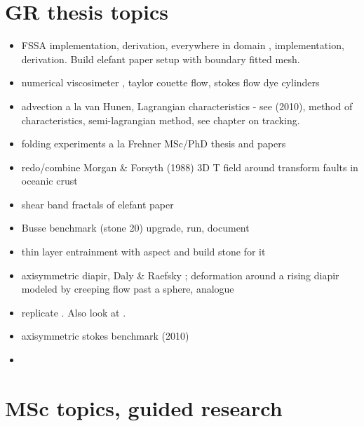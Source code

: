 \documentclass[a4paper]{article}
\begin{document}
\section{GR thesis topics}
\begin{itemize} 
\item FSSA implementation, derivation, everywhere in domain \cite{sctc20}, implementation, derivation. Build elefant paper
      setup with boundary fitted mesh.
\item numerical viscosimeter \cite{batt84}, taylor couette flow, stokes flow dye cylinders
\item advection a la van Hunen, Lagrangian characteristics - see \textcite{bepo10} (2010), method 
      of characteristics, semi-lagrangian method, see chapter on tracking.
\item folding experiments a la Frehner MSc/PhD thesis and papers 
\item redo/combine Morgan \& Forsyth (1988) \cite{mofo88} 3D T field around transform faults in oceanic crust
\item shear band fractals of elefant paper
\item Busse benchmark (stone 20) upgrade, run, document
\item thin layer entrainment with aspect and build stone for it 
\item axisymmetric diapir, Daly \& Raefsky \cite{dara85}; deformation around a rising diapir modeled by creeping 
      flow past a sphere, analogue \cite{crud88}
\item replicate \textcite{khfh15} . Also look at \textcite{khmo21}.
\item axisymmetric stokes benchmark \textcite{lezh10} (2010)
\item 
\end{itemize}





\newpage
\section{MSc topics, guided research}
\end{document}
